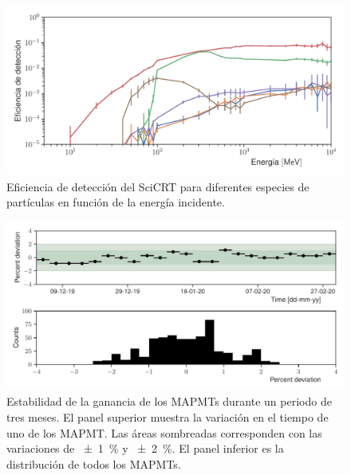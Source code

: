 \begin{figure}
        \centering
        \includegraphics[width=\textwidth]{scibar-efficiency.pdf}
        \caption{Eficiencia de detección del SciCRT para diferentes especies de partículas en función de la energía incidente.}
        \label{fig:total-efficiency}
\end{figure}

\begin{figure}
        \centering
        \includegraphics[width=\textwidth]{neutron-mip_stability.pdf}
        \caption{Estabilidad de la ganancia de los MAPMTs durante un periodo de tres meses. El panel superior muestra la variación en el tiempo de uno de los MAPMT. Las áreas sombreadas corresponden con las variaciones de \SI{\pm 1}{\percent} y \SI{\pm 2}{\percent}. El panel inferior es la distribución de todos los MAPMTs.}
        \label{fig:mip-stability}
\end{figure}



